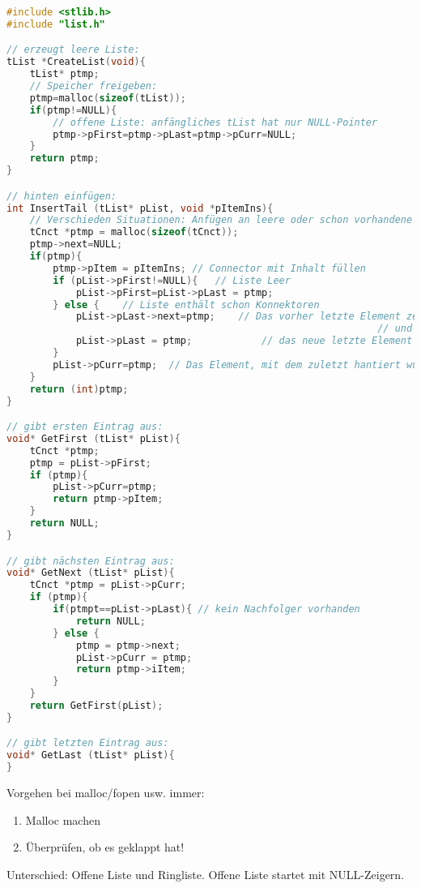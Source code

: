 \documentclass{scrreprt}
\begin{document}
\begin{lstlisting}[language=C]
#include <stlib.h>
#include "list.h"

// erzeugt leere Liste:
tList *CreateList(void){
	tList* ptmp;
	// Speicher freigeben:
	ptmp=malloc(sizeof(tList));
	if(ptmp!=NULL){
		// offene Liste: anfängliches tList hat nur NULL-Pointer
		ptmp->pFirst=ptmp->pLast=ptmp->pCurr=NULL;
	}
	return ptmp;
}

// hinten einfügen:
int InsertTail (tList* pList, void *pItemIns){
	// Verschieden Situationen: Anfügen an leere oder schon vorhandene Liste
	tCnct *ptmp = malloc(sizeof(tCnct));
	ptmp->next=NULL;
	if(ptmp){
		ptmp->pItem = pItemIns;	// Connector mit Inhalt füllen
		if (pList->pFirst!=NULL){	// Liste Leer
			pList->pFirst=pList->pLast = ptmp;
		} else {	// Liste enthält schon Konnektoren
			pList->pLast->next=ptmp;	// Das vorher letzte Element zeigt nun auf das eingefügte
																// und damit neue letzte Element
			pList->pLast = ptmp;			// das neue letzte Element
		}
		pList->pCurr=ptmp;	// Das Element, mit dem zuletzt hantiert wurde ist pCurr
	}
	return (int)ptmp;
}

// gibt ersten Eintrag aus:
void* GetFirst (tList* pList){
	tCnct *ptmp;
	ptmp = pList->pFirst;
	if (ptmp){
		pList->pCurr=ptmp;
		return ptmp->pItem;
	}
	return NULL;
}

// gibt nächsten Eintrag aus:
void* GetNext (tList* pList){
	tCnct *ptmp = pList->pCurr;
	if (ptmp){
		if(ptmpt==pList->pLast){ // kein Nachfolger vorhanden
			return NULL;
		} else {
			ptmp = ptmp->next;
			pList->pCurr = ptmp;
			return ptmp->iItem;
		}
	} 
	return GetFirst(pList);
}

// gibt letzten Eintrag aus:
void* GetLast (tList* pList){
}

\end{lstlisting}

Vorgehen bei malloc/fopen usw. immer:
\begin{enumerate}
\item Malloc machen
\item Überprüfen, ob es geklappt hat!
\end{enumerate}

Unterschied: Offene Liste und Ringliste. Offene Liste startet mit NULL-Zeigern.
\end{document}
